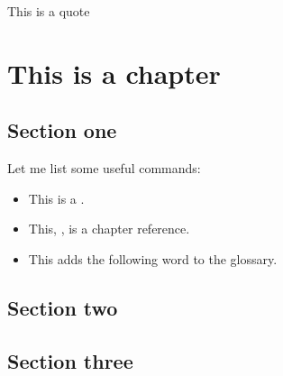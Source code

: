 
\begin{savequote}[75mm]
This is a quote
\end{savequote}

\chapter{This is a chapter}\label{ch:chapter_reference}

	\lipsum[1-2]
	
	\newpage
	
	\section{Section one}\label{sec:section_one_reference}
	
		Let me list some useful commands:
		\begin{itemize}
			\item This is a .
			\item This, , is a chapter reference.
			\item This adds the following \gls{word} to the glossary.
		\end{itemize}
		
	
	
	\section{Section two}\label{sec:section_two_reference}
	
	\section{Section three}\label{sec:section_three_reference}